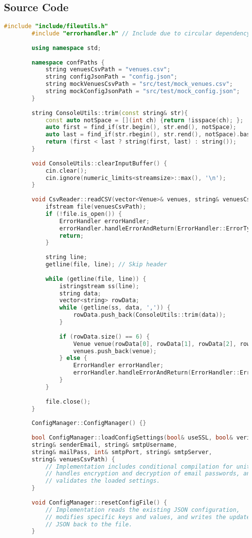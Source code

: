 \documentclass{article}
\begin{document}
	\subsection*{Source Code}
	\begin{lstlisting}[language=C++]
		#include "include/fileutils.h"
		#include "errorhandler.h" // Include due to circular dependency between fileutils.h and errorhandler.h
		
		using namespace std;
		
		namespace confPaths {
			string venuesCsvPath = "venues.csv";
			string configJsonPath = "config.json";
			string mockVenuesCsvPath = "src/test/mock_venues.csv";
			string mockConfigJsonPath = "src/test/mock_config.json";
		}
		
		string ConsoleUtils::trim(const string& str){
			const auto notSpace = [](int ch) {return !isspace(ch); };
			auto first = find_if(str.begin(), str.end(), notSpace);
			auto last = find_if(str.rbegin(), str.rend(), notSpace).base();
			return (first < last ? string(first, last) : string());
		}
		
		void ConsoleUtils::clearInputBuffer() {
			cin.clear();
			cin.ignore(numeric_limits<streamsize>::max(), '\n');
		}
		
		void CsvReader::readCSV(vector<Venue>& venues, string& venuesCsvPath) {
			ifstream file(venuesCsvPath);
			if (!file.is_open()) {
				ErrorHandler errorHandler;
				errorHandler.handleErrorAndReturn(ErrorHandler::ErrorType::CONFIG_OPEN_ERROR, venuesCsvPath);
				return;
			}
			
			string line;
			getline(file, line); // Skip header
			
			while (getline(file, line)) {
				istringstream ss(line);
				string data;
				vector<string> rowData;
				while (getline(ss, data, ',')) {
					rowData.push_back(ConsoleUtils::trim(data));
				}
				
				if (rowData.size() == 6) {
					Venue venue(rowData[0], rowData[1], rowData[2], rowData[3], rowData[4], stoi(rowData[5]));
					venues.push_back(venue);
				} else {
					ErrorHandler errorHandler;
					errorHandler.handleErrorAndReturn(ErrorHandler::ErrorType::INVALID_DATA_IN_CSV, venuesCsvPath);
				}
			}
			
			file.close();
		}
		
		ConfigManager::ConfigManager() {}
		
		bool ConfigManager::loadConfigSettings(bool& useSSL, bool& verifyPeer, bool& verifyHost, bool& verbose, 
		string& senderEmail, string& smtpUsername, 
		string& mailPass, int& smtpPort, string& smtpServer, 
		string& venuesCsvPath) {
			// Implementation includes conditional compilation for unit testing, 
			// handles encryption and decryption of email passwords, and 
			// validates the loaded settings.
		}
		
		void ConfigManager::resetConfigFile() {
			// Implementation reads the existing JSON configuration, 
			// modifies specific keys and values, and writes the updated 
			// JSON back to the file.
		}
	\end{lstlisting}
	
\end{document}
